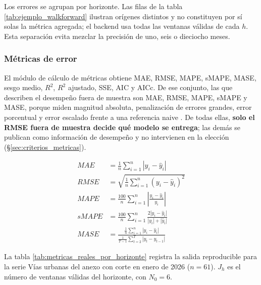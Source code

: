 \documentclass[12pt,letterpaper]{article}
\providecommand{\parencite}{\citep}
\begin{document}
Los errores se agrupan por horizonte. Las filas de la tabla \ref{tab:ejemplo_walkforward} ilustran orígenes distintos y no constituyen por sí solas la métrica agregada; el backend usa todas las ventanas válidas de cada \(h\). Esta separación evita mezclar la precisión de uno, seis o dieciocho meses.

\subsubsection{Métricas de error}

El módulo de cálculo de métricas obtiene MAE, RMSE, MAPE, sMAPE, MASE, sesgo medio, \(R^2\), \(R^2\) ajustado, SSE, AIC y AICc. De ese conjunto, las que describen el desempeño fuera de muestra son MAE, RMSE, MAPE, sMAPE y MASE, porque miden magnitud absoluta, penalización de errores grandes, error porcentual y error escalado frente a una referencia naive \parencite{hyndman_koehler2006}. De todas ellas, \textbf{solo el RMSE fuera de muestra decide qué modelo se entrega}; las demás se publican como información de desempeño y no intervienen en la elección (§\ref{sec:criterios_metricas}).

\begin{align}
MAE &= \frac{1}{n}\sum_{i=1}^{n}|y_i-\hat{y}_i| \\
RMSE &= \sqrt{\frac{1}{n}\sum_{i=1}^{n}(y_i-\hat{y}_i)^2} \\
MAPE &= \frac{100}{n}\sum_{i=1}^{n}\left|\frac{y_i-\hat{y}_i}{y_i}\right| \\
sMAPE &= \frac{100}{n}\sum_{i=1}^{n}\frac{2|y_i-\hat{y}_i|}{|y_i|+|\hat{y}_i|} \\
MASE &= \frac{\frac{1}{n}\sum_{i=1}^{n}|y_i-\hat{y}_i|}{\frac{1}{T-1}\sum_{t=2}^{T}|y_t-y_{t-1}|}
\end{align}

La tabla \ref{tab:metricas_reales_por_horizonte} registra la salida reproducible para la serie Vías urbanas del anexo con corte en enero de 2026 (\(n=61\)). \(J_h\) es el número de ventanas válidas del horizonte, con \(N_0=6\).
\end{document}
